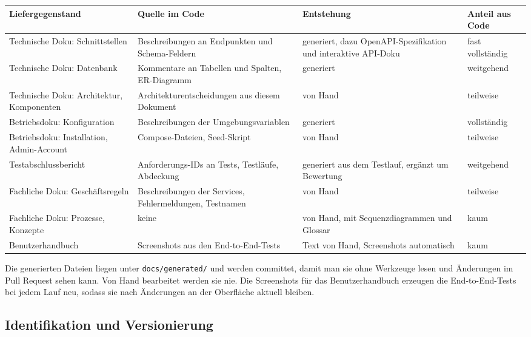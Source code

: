 \documentclass[11pt,a4paper]{article}
\begin{document}
{\small
\begin{tabularx}{\linewidth}{@{}>{\hsize=1.10\hsize\RaggedRight\arraybackslash}X >{\hsize=1.24\hsize\RaggedRight\arraybackslash}X >{\hsize=1.02\hsize\RaggedRight\arraybackslash}X >{\hsize=0.64\hsize\RaggedRight\arraybackslash}X@{}}
\toprule
\textbf{Liefergegenstand} & \textbf{Quelle im Code} & \textbf{Entstehung} & \textbf{Anteil aus Code} \\
\midrule
\endhead
Technische Doku: Schnittstellen & Beschreibungen an Endpunkten und Schema-Feldern & generiert, dazu OpenAPI-Spezifikation und interaktive API-Doku & fast vollständig \\
Technische Doku: Datenbank & Kommentare an Tabellen und Spalten, ER-Diagramm & generiert & weitgehend \\
Technische Doku: Architektur, Komponenten & Architekturentscheidungen aus diesem Dokument & von Hand & teilweise \\
Betriebsdoku: Konfiguration & Beschreibungen der Umgebungsvariablen & generiert & vollständig \\
Betriebsdoku: Installation, Admin-Account & Compose-Dateien, Seed-Skript & von Hand & teilweise \\
Testabschlussbericht & Anforderungs-IDs an Tests, Testläufe, Abdeckung & generiert aus dem Testlauf, ergänzt um Bewertung & weitgehend \\
Fachliche Doku: Geschäftsregeln & Beschreibungen der Services, Fehlermeldungen, Testnamen & von Hand & teilweise \\
Fachliche Doku: Prozesse, Konzepte & keine & von Hand, mit Sequenzdiagrammen und Glossar & kaum \\
Benutzerhandbuch & Screenshots aus den End-to-End-Tests & Text von Hand, Screenshots automatisch & kaum \\
\bottomrule
\end{tabularx}
}

Die generierten Dateien liegen unter \texttt{docs/\allowbreak{}generated/\allowbreak{}} und werden committet, damit man sie ohne Werkzeuge lesen und Änderungen im Pull Request sehen kann. Von Hand bearbeitet werden sie nie. Die Screenshots für das Benutzerhandbuch erzeugen die End-to-End-Tests bei jedem Lauf neu, sodass sie nach Änderungen an der Oberfläche aktuell bleiben.

\subsection{Identifikation und Versionierung}
\end{document}
